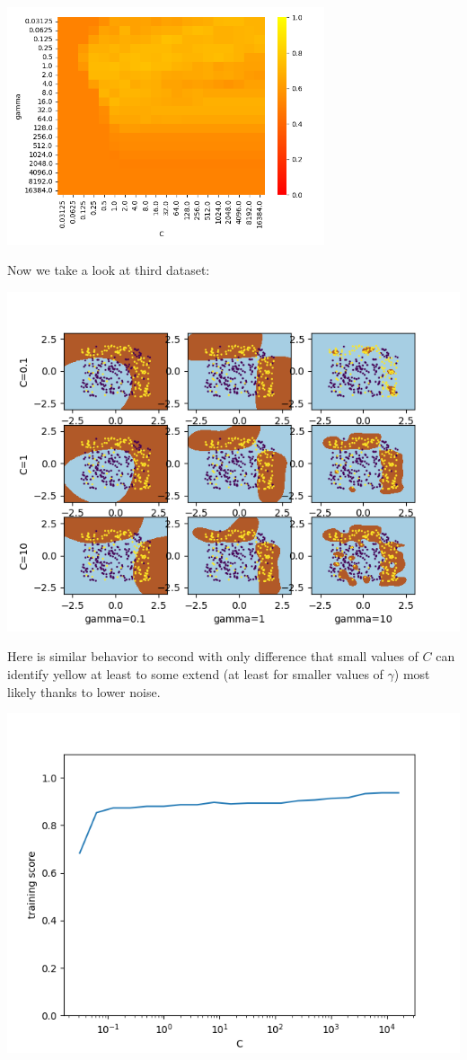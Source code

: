 \documentclass[a4paper]{article}
\begin{document}
	\centerline{\includegraphics[width=0.7\textwidth]{dataset_2_validation_heatmap_scores}}
	
	\newpage
	Now we take a look at third dataset:
	
	\centerline{\includegraphics[width=1.1\textwidth]{dataset_3_diff_c_gamma}}
	
	Here is similar behavior to second with only difference that small values of $C$ can identify yellow at least to some extend (at least for smaller values of $\gamma$) most likely thanks to lower noise.   
	
	\centerline{\includegraphics[width=1\textwidth]{dataset_3_train_C_scores}}  
	
\end{document}
